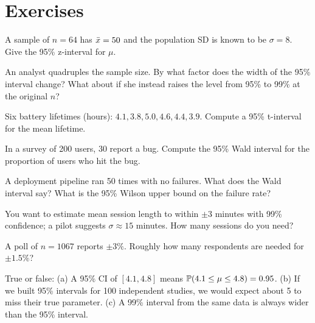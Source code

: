 \section{Exercises}
\label{sec:ci-exercises}

\begin{exercise}
A sample of $n=64$ has $\xbar = 50$ and the population SD is known to be
$\sigma = 8$. Give the 95\% z-interval for $\mu$.
\end{exercise}

\begin{exercise}
An analyst quadruples the sample size. By what factor does the width of the
95\% interval change? What about if she instead raises the level from 95\% to
99\% at the original $n$?
\end{exercise}

\begin{exercise}
Six battery lifetimes (hours): $4.1, 3.8, 5.0, 4.6, 4.4, 3.9$. Compute a 95\%
t-interval for the mean lifetime.
\end{exercise}

\begin{exercise}
In a survey of 200 users, 30 report a bug. Compute the 95\% Wald interval for
the proportion of users who hit the bug.
\end{exercise}

\begin{exercise}
A deployment pipeline ran 50 times with no failures. What does the Wald
interval say? What is the 95\% Wilson upper bound on the failure rate?
\end{exercise}

\begin{exercise}
You want to estimate mean session length to within $\pm 3$ minutes with 99\%
confidence; a pilot suggests $\sigma \approx 15$ minutes. How many sessions do
you need?
\end{exercise}

\begin{exercise}
A poll of $n=1067$ reports $\pm 3\%$. Roughly how many respondents are needed for
$\pm 1.5\%$?
\end{exercise}

\begin{exercise}
True or false: (a) A 95\% CI of $[4.1, 4.8]$ means $\P(4.1\le\mu\le4.8)=0.95$.
(b) If we built 95\% intervals for 100 independent studies, we would expect
about 5 to miss their true parameter. (c) A 99\% interval from the same data is
always wider than the 95\% interval.
\end{exercise}

